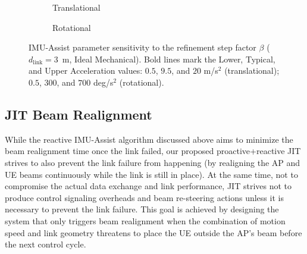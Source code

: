 \documentclass[fleqn,10pt]{wlscirep}
\newcommand{\rev}[1]{{\color{revblue}#1}}
\begin{document}
\begin{figure}[ht!]
    \centering
    \begin{subfigure}{0.495\linewidth}
        
        \vspace{-25pt}
        \caption{Translational}
        \label{fig:tuning_imu_trans}
    \end{subfigure}
    \hfill
    \begin{subfigure}{0.495\linewidth}
        
        \vspace{-25pt}
        \caption{Rotational}
        \label{fig:tuning_imu_rot}
    \end{subfigure}
    \caption{\rev{IMU-Assist parameter sensitivity to the refinement step factor $\beta$ ($d_{\text{link}} = 3$~m, Ideal Mechanical). Bold lines mark the Lower, Typical, and Upper Acceleration values: $0.5$, $9.5$, and $20$ m/s$^2$ (translational); $0.5$, $300$, and $700$ deg/s$^2$ (rotational).}}
    \label{fig:tuning_imu}
    \vspace{-5pt}
\end{figure}

\subsection*{JIT Beam Realignment}
While the reactive IMU-Assist algorithm discussed above aims to minimize the beam realignment time once the link failed, our proposed proactive+reactive JIT strives to also prevent the link failure from happening (by realigning the AP and UE beams continuously while the link is still in place). At the same time, not to compromise the actual data exchange and link performance, JIT strives not to produce control signaling overheads and beam re-steering actions unless it is necessary to prevent the link failure. This goal is achieved by designing the system that only triggers beam realignment when the combination of motion speed and link geometry threatens to place the UE outside the AP's beam before the next control cycle.
\end{document}
